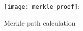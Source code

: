 \begin{figure}[H]
    \centering
    \texttt{[image: merkle\_proof]}:
    \caption{Merkle path calculation~\cite{smartproperty}}
    \label{fig:Merkleproof}
\end{figure}
